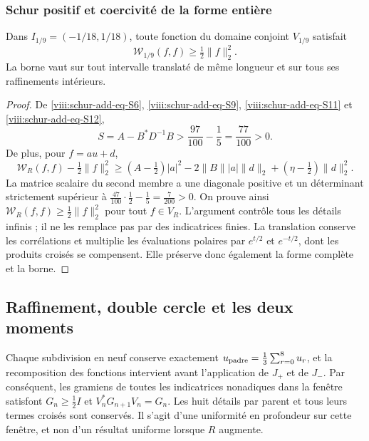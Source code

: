 \subsubsection{Schur positif et coercivité de la forme entière}
\label{viii:schur-add-sub-348}

\begin{theorem}
\label{viii:schur-add:coercividad-ventana}
Dans \(I_{1/9}=(-1/18,1/18)\), toute fonction du domaine conjoint
\(V_{1/9}\) satisfait
\[
\mathscr W_{1/9}(f,f)\geq\tfrac12\|f\|_2^2.
\]
La borne vaut sur tout intervalle translaté de même longueur et sur tous
ses raffinements intérieurs.
\end{theorem}
\begin{proof}
De \eqref{viii:schur-add-eq-S6}, \eqref{viii:schur-add-eq-S9}, \eqref{viii:schur-add-eq-S11} et \eqref{viii:schur-add-eq-S12},
\begin{equation}
S=A-B^*D^{-1}B>\frac{97}{100}-\frac15=\frac{77}{100}>0.
\label{viii:schur-add-display-29}
\end{equation}
De plus, pour \(f=au+d\),
\begin{equation}
\mathscr W_R(f,f)-\tfrac12\|f\|_2^2
\geq(A-\tfrac12)|a|^2
-2\|B\||a|\|d\|_2+(\eta-\tfrac12)\|d\|_2^2.
\label{viii:schur-add-display-30}
\end{equation}
La matrice scalaire du second membre a une diagonale positive et un déterminant strictement supérieur à \(\tfrac{47}{100}\cdot\tfrac12-\tfrac15=\tfrac7{200}>0\). On prouve ainsi \(\mathscr W_R(f,f)\geq\tfrac12\|f\|_2^2\) pour tout \(f\in V_R\). L'argument contrôle tous les détails infinis ; il ne les remplace pas par des indicatrices finies. La translation conserve les corrélations et multiplie les évaluations polaires par \(e^{t/2}\) et \(e^{-t/2}\), dont les produits croisés se compensent. Elle préserve donc également la forme complète et la borne.
\end{proof}

\subsection{Raffinement, double cercle et les deux moments}
\label{viii:schur-add-sub-367}

Chaque subdivision en neuf conserve exactement
\(u_{\rm padre}=\tfrac13\sum_{r=0}^8u_r\), et la recomposition des
fonctions intervient avant l'application de \(J_+\) et de \(J_-\). Par conséquent,
les gramiens de toutes les indicatrices nonadiques dans la fenêtre
satisfont \(G_n\geq\tfrac12 I\) et
\(V_n^*G_{n+1}V_n=G_n\). Les huit détails par parent et
tous leurs termes croisés sont conservés. Il s'agit d'une uniformité en profondeur sur cette fenêtre,
et non d'un résultat uniforme lorsque \(R\) augmente.

